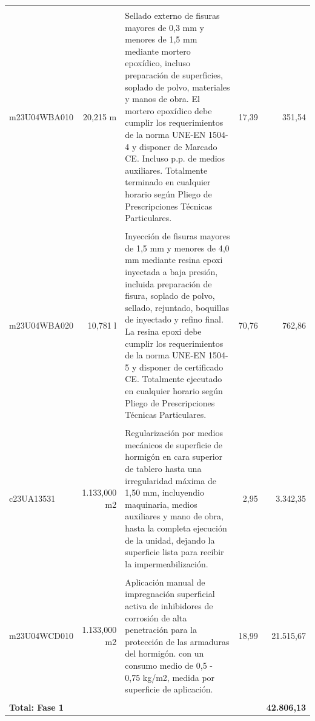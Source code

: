 \documentclass{book}%
\begin{document}
\begin{longtable}{lrlrr}
&&&&\\%
m23U04WBA010&    20,215 m&\multicolumn{1}{p{5cm}}{Sellado externo de fisuras mayores de 0,3 mm y menores de 1,5 mm mediante mortero epoxídico, incluso preparación de superficies, soplado de polvo, materiales y manos de obra. El mortero epoxídico debe cumplir los requerimientos de la norma UNE{-}EN 1504{-}4 y disponer de Marcado CE. Incluso p.p. de medios auxiliares. Totalmente terminado en cualquier horario según Pliego de Prescripciones Técnicas Particulares.}&     17,39&351,54\\%
&&&&\\%
m23U04WBA020&    10,781 l&\multicolumn{1}{p{5cm}}{Inyección de fisuras mayores de 1,5 mm y menores de 4,0 mm mediante resina epoxi inyectada a baja presión, incluida preparación de fisura, soplado de polvo, sellado, rejuntado, boquillas de inyectado y refino final. La resina epoxi debe cumplir los requerimientos de la norma UNE{-}EN 1504{-}5 y disponer de certificado CE. Totalmente ejecutado en cualquier horario según Pliego de Prescripciones Técnicas Particulares.}&     70,76&762,86\\%
&&&&\\%
c23UA13531& 1.133,000 m2&\multicolumn{1}{p{5cm}}{Regularización por medios mecánicos de superficie de hormigón en cara superior de tablero hasta una irregularidad máxima de 1,50 mm, incluyendio maquinaria, medios auxiliares y mano de obra, hasta la completa ejecución de la unidad, dejando la superficie lista para recibir la impermeabilización.}&      2,95&3.342,35\\%
&&&&\\%
m23U04WCD010& 1.133,000 m2&\multicolumn{1}{p{5cm}}{Aplicación manual de impregnación superficial activa de inhibidores de corrosión de alta penetración para la protección de las armaduras del hormigón. con un consumo medio de 0,5 {-} 0,75 kg/m2, medida por superficie de aplicación.}&     18,99&21.515,67\\%
&&&&\\%
\multicolumn{4}{p{8cm}}{\textbf{Total: Fase 1}}&\textbf{42.806,13}\\%
\end{longtable}%
\normalsize

%
\end{document}
